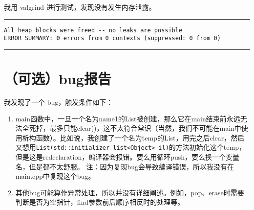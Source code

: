 \documentclass[UTF8]{ctexart}
\begin{document}
我用 valgrind 进行测试，发现没有发生内存泄露。

\noindent\rule{\textwidth}{1pt}
\begin{lstlisting}
All heap blocks were freed -- no leaks are possible
ERROR SUMMARY: 0 errors from 0 contexts (suppressed: 0 from 0)
\end{lstlisting}
\noindent\rule{\textwidth}{1pt}

\section{（可选）bug报告}

我发现了一个 bug，触发条件如下：

\begin{enumerate}
    \item main函数中，一旦一个名为name1的List被创建，那么它在main结束前永远无法全死掉，最多只能clear()，这不太符合常识（当然，我们不可能在main中使用析构函数）。比如说，我创建了一个名为temp的List，用完之后clear，然后又想用\lstinline|List(std::initializer_list<Object> il)|的方法初始化这个temp，但是这是redeclaration，编译器会报错。要么用循环push，要么换一个变量名，但是都不太舒服。
    注：因为复现bug会导致编译错误，所以我没有在main.cpp中复现这个bug。
    \item 其他bug可能算作异常处理，所以并没有详细阐述。例如，pop、erase时需要判断是否为空指针，find参数前后顺序相反时的处理等。
\end{enumerate}
\end{document}
